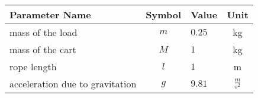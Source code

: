 \begin{tabular}{lclc}
\hline
 Parameter Name                  &  Symbol  & Value   &      Unit       \\
\hline
 mass of the load                &   $m$    & $0.25$  &       kg        \\
 mass of the cart                &   $M$    & $1$     &       kg        \\
 rope length                     &   $l$    & $1$     &        m        \\
 acceleration due to gravitation &   $g$    & $9.81$  & $\frac{m}{s^2}$ \\
\hline
\end{tabular}